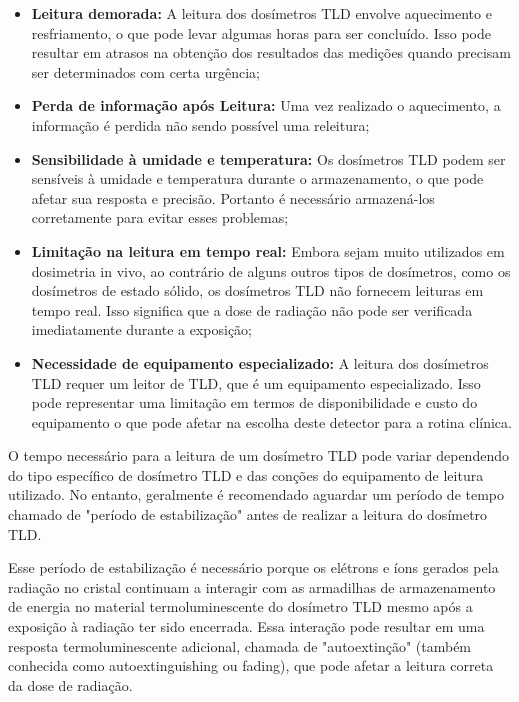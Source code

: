 \documentclass[11pt,a4paper]{article}
\begin{document}
		\begin{itemize}[label=\textcolor{CarnationPink}{$\blacktriangleright$}]
			\item \textbf{Leitura demorada: } A leitura dos dosímetros TLD envolve aquecimento e resfriamento, o que pode levar algumas horas para ser concluído. Isso pode resultar em atrasos na obtenção dos resultados das medições quando precisam ser determinados com certa urgência;
			\item \textbf{Perda de informação após Leitura: } Uma vez realizado o aquecimento, a informação é perdida não sendo possível uma releitura;
			\item \textbf{Sensibilidade à umidade e temperatura:} Os dosímetros TLD podem ser sensíveis à umidade e temperatura durante o armazenamento, o que pode afetar sua resposta e precisão. Portanto é necessário armazená-los corretamente para evitar esses problemas;
			\item \textbf{Limitação na leitura em tempo real:} Embora sejam muito utilizados em dosimetria in vivo, ao contrário de alguns outros tipos de dosímetros, como os dosímetros de estado sólido, os dosímetros TLD não fornecem leituras em tempo real. Isso significa que a dose de radiação não pode ser verificada imediatamente durante a exposição;
			\item \textbf{Necessidade de equipamento especializado:} A leitura dos dosímetros TLD requer um leitor de TLD, que é um equipamento especializado. Isso pode representar uma limitação em termos de disponibilidade e custo do equipamento o que pode afetar na escolha deste detector para a rotina clínica.
		\end{itemize}

		O tempo necessário para a leitura de um dosímetro TLD pode variar dependendo do tipo específico de dosímetro TLD e das conções do equipamento de leitura utilizado. No entanto, geralmente é recomendado aguardar um período de tempo chamado de "período de estabilização" antes de realizar a leitura do dosímetro TLD.

		Esse período de estabilização é necessário porque os elétrons e íons gerados pela radiação no cristal continuam a interagir com as armadilhas de armazenamento de energia no material termoluminescente do dosímetro TLD mesmo após a exposição à radiação ter sido encerrada. Essa interação pode resultar em uma resposta termoluminescente adicional, chamada de "autoextinção" (também conhecida como autoextinguishing ou fading), que pode afetar a leitura correta da dose de radiação. 
\end{document}
